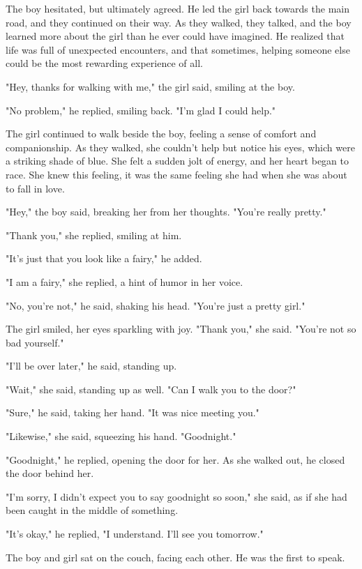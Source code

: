 \documentclass[smalldemyvopaper,11pt,twoside,onecolumn,openright,extrafontsizes]{memoir}
\begin{document}
The boy hesitated, but ultimately agreed. He led the girl back towards the main road, and they continued on their way. As they walked, they talked, and the boy learned more about the girl than he ever could have imagined. He realized that life was full of unexpected encounters, and that sometimes, helping someone else could be the most rewarding experience of all.\par
"Hey, thanks for walking with me," the girl said, smiling at the boy.\par
"No problem," he replied, smiling back. "I'm glad I could help."\par
The girl continued to walk beside the boy, feeling a sense of comfort and companionship. As they walked, she couldn't help but notice his eyes, which were a striking shade of blue. She felt a sudden jolt of energy, and her heart began to race. She knew this feeling, it was the same feeling she had when she was about to fall in love.\par
"Hey," the boy said, breaking her from her thoughts. "You're really pretty."\par
"Thank you," she replied, smiling at him.\par
"It's just that you look like a fairy," he added.\par
"I am a fairy," she replied, a hint of humor in her voice.\par
"No, you're not," he said, shaking his head. "You're just a pretty girl."\par
The girl smiled, her eyes sparkling with joy. "Thank you," she said. "You're not so bad yourself."\par
"I'll be over later," he said, standing up.\par
"Wait," she said, standing up as well. "Can I walk you to the door?"\par
"Sure," he said, taking her hand. "It was nice meeting you."\par
"Likewise," she said, squeezing his hand. "Goodnight."\par
"Goodnight," he replied, opening the door for her. As she walked out, he closed the door behind her.\par
"I'm sorry, I didn't expect you to say goodnight so soon," she said, as if she had been caught in the middle of something.\par
"It's okay," he replied, "I understand. I'll see you tomorrow."\par
The boy and girl sat on the couch, facing each other. He was the first to speak.\par
\end{document}
